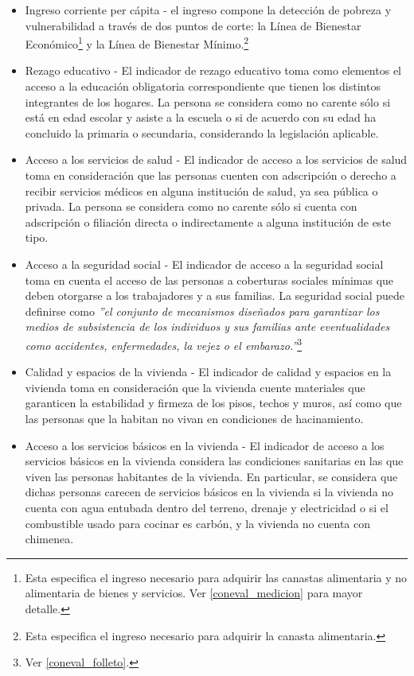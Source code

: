 \begin{itemize}
    \item Ingreso corriente per cápita - el ingreso compone la detección de pobreza y vulnerabilidad a través de dos puntos de corte: la Línea de Bienestar Económico\footnote{Esta especifica el ingreso necesario para adquirir las canastas alimentaria y no alimentaria de bienes y servicios. Ver \ref{coneval_medicion} para mayor detalle.} y la Línea de Bienestar Mínimo.\footnote{Esta especifica el ingreso necesario para adquirir la canasta alimentaria.}
    \item Rezago educativo - El indicador de rezago educativo toma como elementos el acceso a la educación obligatoria correspondiente que tienen los distintos integrantes de los hogares. La persona se considera como no carente sólo si está en edad escolar y asiste a la escuela o si de acuerdo con su edad ha concluido la primaria o secundaria, considerando la legislación aplicable.
    \item Acceso a los servicios de salud - El indicador de acceso a los servicios de salud toma en consideración que las personas cuenten con adscripción o derecho a recibir servicios médicos en alguna institución de salud, ya sea pública o privada. La persona se considera como no carente sólo si cuenta con adscripción o filiación directa o indirectamente a alguna institución de este tipo.
    \item Acceso a la seguridad social - El indicador de acceso a la seguridad social toma en cuenta el acceso de las personas a coberturas sociales mínimas que deben otorgarse a los trabajadores y a sus familias. La seguridad social puede definirse como \textit{''el conjunto de mecanismos diseñados para garantizar los medios de subsistencia de los individuos y sus familias ante eventualidades como accidentes, enfermedades, la vejez o el embarazo.''}\footnote{Ver \ref{coneval_folleto}.}
    \item Calidad y espacios de la vivienda - El indicador de calidad y espacios en la vivienda toma en consideración que la vivienda cuente materiales que garanticen la estabilidad y firmeza de los pisos, techos y muros, así como que las personas que la habitan no vivan en condiciones de hacinamiento.
    \item Acceso a los servicios básicos en la vivienda - El indicador de acceso a los servicios básicos en la vivienda considera las condiciones sanitarias en las que viven las personas habitantes de la vivienda. En particular, se considera que dichas personas carecen de servicios básicos en la vivienda si la vivienda no cuenta con agua entubada dentro del terreno, drenaje y electricidad o si el combustible usado para cocinar es carbón, y la vivienda no cuenta con chimenea.

\end{itemize}
